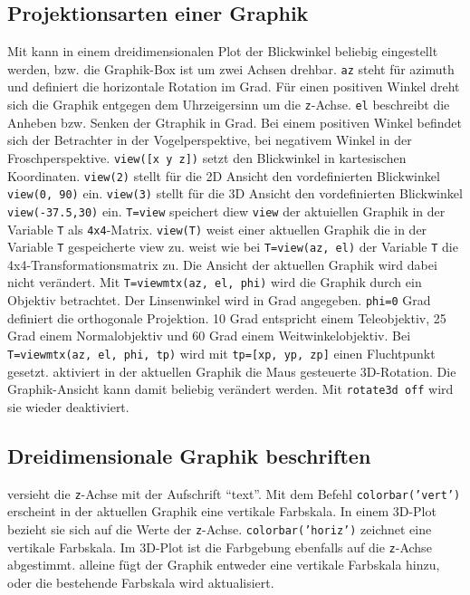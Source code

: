 \subsection{Projektionsarten einer Graphik}
Mit  kann in einem dreidimensionalen Plot der Blickwinkel beliebig eingestellt werden, bzw. die Graphik-Box ist um zwei Achsen drehbar. {\color{red}\texttt{az}} steht für azimuth und definiert die horizontale Rotation im Grad. Für einen positiven Winkel dreht sich die Graphik entgegen dem Uhrzeigersinn um die \texttt{z}-Achse. {\color{red}\texttt{el}} beschreibt die Anheben bzw. Senken der Gtraphik in Grad. Bei einem positiven Winkel befindet sich der Betrachter in der Vogelperspektive, bei negativem Winkel in der Froschperspektive. {\color{red}\texttt{view([x y z])}} setzt den Blickwinkel in kartesischen Koordinaten. {\color{red}\texttt{view(2)}} stellt für die 2D Ansicht den vordefinierten Blickwinkel {\color{red}\texttt{view(0, 90)}} ein. {\color{red}\texttt{view(3)}} stellt für die 3D Ansicht den vordefinierten Blickwinkel {\color{red}\texttt{view(-37.5,30)}} ein. {\color{red}\texttt{T=view}} speichert diew \texttt{view} der aktuiellen Graphik in der Variable \texttt{T} als \texttt{4x4}-Matrix. {\color{red}\texttt{view(T)}} weist einer aktuellen Graphik die in der Variable \texttt{T} gespeicherte view zu.
\newline\newline
{} weist wie bei {\color{red}\texttt{T=view(az, el)}} der Variable \texttt{T} die 4x4-Transformationsmatrix zu. Die Ansicht der aktuellen Graphik wird dabei nicht verändert. Mit {\color{red}\texttt{T=viewmtx(az, el, phi)}} wird die Graphik durch ein Objektiv betrachtet. Der Linsenwinkel wird in Grad angegeben. \texttt{phi=0} Grad definiert die orthogonale Projektion. 10 Grad entspricht einem Teleobjektiv, 25 Grad einem Normalobjektiv und 60 Grad einem Weitwinkelobjektiv. Bei {\color{red}\texttt{T=viewmtx(az, el, phi, tp)}} wird mit \texttt{tp=[xp, yp, zp]} einen Fluchtpunkt gesetzt.
\newline\newline
{} aktiviert in der aktuellen Graphik die Maus gesteuerte 3D-Rotation. Die Graphik-Ansicht kann damit beliebig verändert werden. Mit {\color{red}\texttt{rotate3d off}} wird sie wieder deaktiviert.
\subsection{Dreidimensionale Graphik beschriften}
 versieht die \texttt{z}-Achse mit der Aufschrift ``text''. Mit dem Befehl {\color{red}\texttt{colorbar('vert')}} erscheint in der aktuellen Graphik eine vertikale Farbskala. In einem 3D-Plot bezieht sie sich auf die Werte der \texttt{z}-Achse. {\color{red}\texttt{colorbar('horiz')}} zeichnet eine vertikale Farbskala. Im 3D-Plot ist die Farbgebung ebenfalls auf die \texttt{z}-Achse abgestimmt.  alleine fügt der Graphik entweder eine vertikale Farbskala hinzu, oder die bestehende Farbskala wird aktualisiert.
